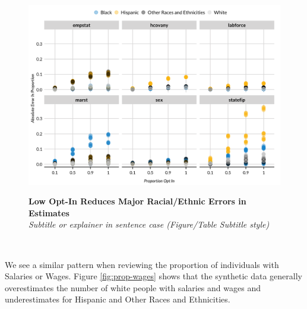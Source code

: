 \documentclass[
]{urban-formatting}
\begin{document}
\begin{figure}[htbp]
    \caption{
    \textbf{Low Opt-In Reduces Major Racial/Ethnic Errors in Estimates}\\
    \textit{Subtitle or explainer in sentence case (Figure/Table Subtitle style)}
    }
    \centering
    \includegraphics[width=6.5in]{../analysis/figures/proportions-3.png}
    \label{fig:proportions-race-ethnicity}
\end{figure}
\begin{singlespace}
    \\
\end{singlespace}

We see a similar pattern when reviewing the proportion of individuals
with Salaries or Wages. Figure \ref{fig:prop-wages} shows that the
synthetic data generally overestimates the number of white people with
salaries and wages and underestimates for Hispanic and Other Races and
Ethnicities.
\end{document}
